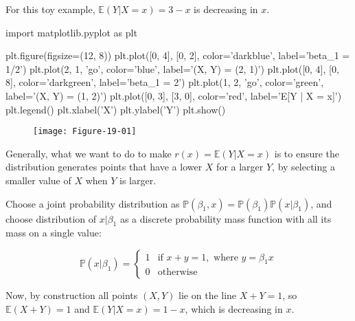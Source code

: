 For this toy example, \(\mathbb{E}(Y | X = x) = 3 - x\) is decreasing in
\(x\).

\begin{python}
import matplotlib.pyplot as plt

plt.figure(figsize=(12, 8))
plt.plot([0, 4], [0, 2], color='darkblue', label='beta_{1} = 1/2')
plt.plot(2, 1, 'go', color='blue', label='(X, Y) = (2, 1)')
plt.plot([0, 4], [0, 8], color='darkgreen', label='beta_{1} = 2')
plt.plot(1, 2, 'go', color='green', label='(X, Y) = (1, 2)')
plt.plot([0, 3], [3, 0], color='red', label='E[Y | X = x]')
plt.legend()
plt.xlabel('X')
plt.ylabel('Y')
plt.show()
\end{python}

\begin{figure}[H]
\centering
\texttt{[image: Figure-19-01]}
\end{figure}

Generally, what we want to do to make \(r(x) = \mathbb{E}(Y | X = x)\)
is to ensure the distribution generates points that have a lower \(X\)
for a larger \(Y\), by selecting a smaller value of \(X\) when \(Y\) is
larger.

Choose a joint probability distribution as
\(\mathbb{P}(\beta_{1}, x) = \mathbb{P}(\beta_{1}) \mathbb{P}(x | \beta_{1})\),
and  choose distribution of \(x | \beta_{1}\) as a discrete
probability mass function with all its mass on a single value:

\[
\mathbb{P}(x | \beta_{1}) = \begin{cases}
1 & \text{if } x + y = 1, \text{ where } y = \beta_{1} x\\
0 & \text{otherwise}
\end{cases}
\]

Now, by construction all points \((X, Y)\) lie on the line
\(X + Y = 1\), so \(\mathbb{E}(X + Y) = 1\) and
\(\mathbb{E}(Y | X = x) = 1 - x\), which is decreasing in \(x\).

